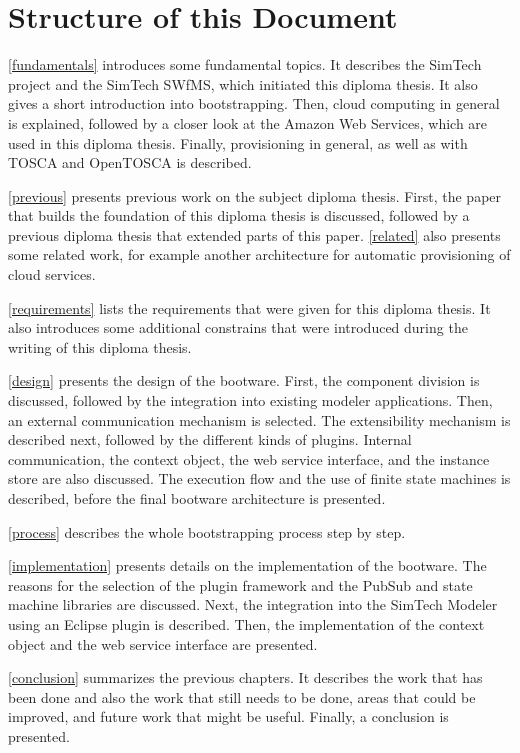 \section{Structure of this Document}

\autoref{fundamentals} introduces some fundamental topics.
It describes the SimTech project and the SimTech SWfMS, which initiated this diploma thesis.
It also gives a short introduction into bootstrapping.
Then, cloud computing in general is explained, followed by a closer look at the Amazon Web Services, which are used in this diploma thesis.
Finally, provisioning in general, as well as with TOSCA and OpenTOSCA is described.

\autoref{previous} presents previous work on the subject diploma thesis.
First, the paper that builds the foundation of this diploma thesis is discussed, followed by a previous diploma thesis that extended parts of this paper.
\autoref{related} also presents some related work, for example another architecture for automatic provisioning of cloud services.

\autoref{requirements} lists the requirements that were given for this diploma thesis.
It also introduces some additional constrains that were introduced during the writing of this diploma thesis.

\autoref{design} presents the design of the bootware.
First, the component division is discussed, followed by the integration into existing modeler applications.
Then, an external communication mechanism is selected.
The extensibility mechanism is described next, followed by the different kinds of plugins.
Internal communication, the context object, the web service interface, and the instance store are also discussed.
The execution flow and the use of finite state machines is described, before the final bootware architecture is presented.

\autoref{process} describes the whole bootstrapping process step by step.

\autoref{implementation} presents details on the implementation of the bootware.
The reasons for the selection of the plugin framework and the PubSub and state machine libraries are discussed.
Next, the integration into the SimTech Modeler using an Eclipse plugin is described.
Then, the implementation of the context object and the web service interface are presented.

\autoref{conclusion} summarizes the previous chapters.
It describes the work that has been done and also the work that still needs to be done, areas that could be improved, and future work that might be useful.
Finally, a conclusion is presented.

